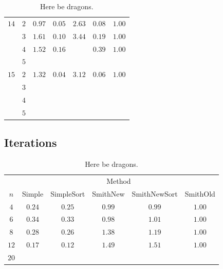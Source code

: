 \begin{table}[htbp]
\begin{tabular}{ccccccc}
    \cmidrule(r){1-2}
    $14$ & $2$ & $0.97$ & $0.05$     & $2.63$   & $0.08$       & $1.00$   \\
         & $3$ & $1.61$ & $0.10$     & $3.44$   & $0.19$       & $1.00$   \\
         & $4$ & $1.52$ & $0.16$     &          & $0.39$       & $1.00$   \\
         & $5$ &        &            &          &              &          \\
    \cmidrule(r){1-2}
    $15$ & $2$ & $1.32$ & $0.04$     & $3.12$   & $0.06$       & $1.00$   \\
         & $3$ &        &            &          &              &          \\
         & $4$ &        &            &          &              &          \\
         & $5$ &        &            &          &              &          \\
    \bottomrule
  \end{tabular}
  \caption[Here be dragons]{Here be dragons.\label{tab:trees-sausage}}
\end{table}

\subsection{Iterations}
\label{sec:iterations}

\begin{table}[htbp]
  \centering
  \small
  \begin{tabular}{cccccc}
    \toprule
         & \multicolumn{5}{c}{Method}                               \\
    \cmidrule(l){2-6}
    $n$  & Simple & SimpleSort & SmithNew & SmithNewSort & SmithOld \\
    \cmidrule(r){1-1}\cmidrule(l){2-6}
    $4$  & $0.24$ & $0.25$     & $0.99$   & $0.99$       & $1.00$   \\
    $6$  & $0.34$ & $0.33$     & $0.98$   & $1.01$       & $1.00$   \\
    $8$  & $0.28$ & $0.26$     & $1.38$   & $1.19$       & $1.00$   \\
    $12$ & $0.17$ & $0.12$     & $1.49$   & $1.51$       & $1.00$   \\
    $20$ &        &            &          &              &          \\
    \bottomrule
  \end{tabular}
  \caption[Here be dragons]{Here be dragons.\label{tab:iterations-solids-ratio}}
\end{table}

